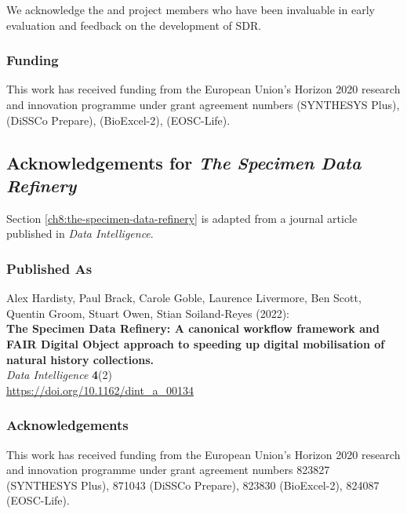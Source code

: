 We acknowledge the  and
 project members who have been
invaluable in early evaluation and feedback on the development of SDR.

\hypertarget{funding-2}{%
\subsubsection*{Funding}\label{funding-2}}

This work has received funding from the European Union's Horizon 2020
research and innovation programme under grant agreement numbers
(SYNTHESYS Plus),  (DiSSCo
Prepare),  (BioExcel-2),
 (EOSC-Life).




\subsection{Acknowledgements for \emph{The Specimen Data Refinery}}

Section \vref{ch8:the-specimen-data-refinery} is adapted from a journal article published in \emph{Data Intelligence}.

\subsubsection*{Published As}

Alex Hardisty, Paul Brack, Carole Goble, Laurence Livermore, Ben Scott,
Quentin Groom, Stuart Owen, Stian Soiland-Reyes (2022):\\
\textbf{The Specimen Data Refinery: A canonical workflow framework and
FAIR Digital Object approach to speeding up digital mobilisation of
natural history collections.}\\
\emph{Data Intelligence} \textbf{4}(2)\\
\url{https://doi.org/10.1162/dint_a_00134}


\subsubsection*{Acknowledgements}

This work has received funding from the European Union's Horizon 2020
research and innovation programme under grant agreement numbers 823827
(SYNTHESYS Plus), 871043 (DiSSCo Prepare), 823830 (BioExcel-2), 824087
(EOSC-Life).



